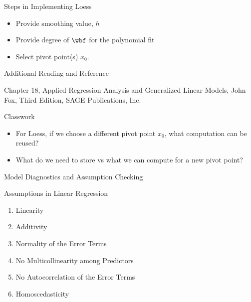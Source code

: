 \documentclass[aspectratio=169,xcolor=dvipsnames,svgnames,x11names,fleqn]{beamer}
\begin{document}
    \begin{frame}{Steps in Implementing Loess}
        \begin{itemize}
            \item Provide smoothing value, $h$
            \item Provide degree of $\wbf$ for the polynomial fit
            \item Select pivot point(s) $x_0$.
        \end{itemize}
    \end{frame}

    \begin{frame}{Additional Reading and Reference}
        
        \Large
\begin{center}
    Chapter 18, Applied Regression Analysis and Generalized Linear Models, John Fox, Third Edition, SAGE Publications, Inc.
\end{center}

    \end{frame}

    \begin{frame}{Classwork}

        \begin{itemize}
            \item  For Loess, if we choose a different pivot point $x_0$, what computation can be reused? 
            \item  What do we need to store vs what we can compute for a new pivot point?
        \end{itemize}

    \end{frame}



\begin{sectionframe}{\faGroup}{Model Diagnostics and Assumption Checking}
\end{sectionframe}

\begin{frame}{Assumptions in Linear Regression}
    \begin{enumerate}
        \item Linearity
        \item Additivity
        \item Normality of the Error Terms
        \item No Multicollinearity among Predictors
        \item No Autocorrelation of the Error Terms
        \item Homoscedasticity
    \end{enumerate}
\end{frame}
\end{document}
